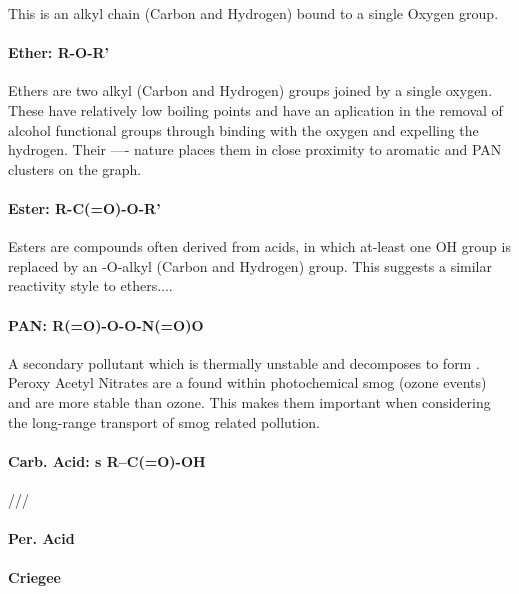 This is an alkyl chain (Carbon and Hydrogen) bound to a single Oxygen group.


\paragraph{Ether: R-O-R'}

Ethers are two alkyl (Carbon and Hydrogen) groups joined by a single oxygen. These have relatively low boiling points and have an aplication in the removal of alcohol functional groups through binding with the oxygen and expelling the hydrogen. Their ---- nature places them in close proximity to aromatic and PAN clusters on the graph.


\paragraph{Ester: R-C(=O)-O-R'}
Esters are compounds often derived from acids, in which at-least one OH group is replaced by an -O-alkyl (Carbon and Hydrogen) group. This suggests a similar reactivity style to ethers....

\paragraph{PAN: R(=O)-O-O-N(=O)O}

A secondary pollutant which is thermally unstable and decomposes to form . Peroxy Acetyl Nitrates are a found within photochemical smog (ozone events) and are more stable than ozone. This makes them important when considering the long-range transport of smog related pollution.


\paragraph{Carb. Acid: s R–C(=O)-OH}
///
\paragraph{Per. Acid}
\paragraph{Criegee}














